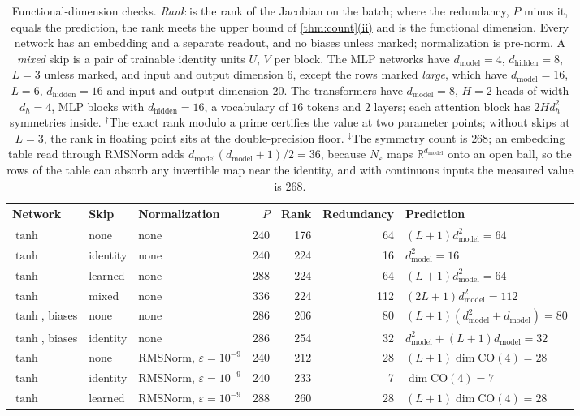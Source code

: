 \documentclass[10pt]{article}
\theoremstyle{definition}
\theoremstyle{remark}
\newcommand{\R}{\mathbb{R}}
\newcommand{\dm}{d_{\mathrm{model}}}
\newcommand{\dhid}{d_{\mathrm{hidden}}}
\newcommand{\CO}{\mathrm{CO}}
\DeclareRobustCommand{\cpref}[2]{\hyperref[#1:#2]{\cref*{#1}(#2)}}
\begin{document}
\begin{table}[ht]
\centering\footnotesize\setlength{\tabcolsep}{2pt}
\caption{Functional-dimension checks. \emph{Rank} is the rank of the Jacobian on the batch; where the redundancy, $P$ minus it, equals the prediction, the rank meets the upper bound of \cpref{thm:count}{ii} and is the functional dimension. Every network has an embedding and a separate readout, and no biases unless marked; normalization is pre-norm. A \emph{mixed} skip is a pair of trainable identity units $U$, $V$ per block. The MLP networks have $\dm = 4$, $\dhid = 8$, $L = 3$ unless marked, and input and output dimension $6$, except the rows marked \emph{large}, which have $\dm = 16$, $L = 6$, $\dhid = 16$ and input and output dimension $20$. The transformers have $\dm = 8$, $H = 2$ heads of width $d_h = 4$, MLP blocks with $\dhid = 16$, a vocabulary of $16$ tokens and $2$ layers; each attention block has $2Hd_h^2$ symmetries inside. $^\dagger$The exact rank modulo a prime certifies the value at two parameter points; without skips at $L = 3$, the rank in floating point sits at the double-precision floor. $^\ddagger$The symmetry count is $268$; an embedding table read through RMSNorm adds $\dm(\dm+1)/2 = 36$, because $N_\varepsilon$ maps $\R^{\dm}$ onto an open ball, so the rows of the table can absorb any invertible map near the identity, and with continuous inputs the measured value is $268$.}
\label{tab:checks}
\begin{tabular}{@{}lllrrrl@{}}
\toprule
Network & Skip & Normalization & $P$ & Rank & Redundancy & Prediction \\
\midrule
$\tanh$ & none & none & 240 & 176 & 64 & $(L{+}1)\dm^2 = 64$ \\
$\tanh$ & identity & none & 240 & 224 & 16 & $\dm^2 = 16$ \\
$\tanh$ & learned & none & 288 & 224 & 64 & $(L{+}1)\dm^2 = 64$ \\
$\tanh$ & mixed & none & 336 & 224 & 112 & $(2L{+}1)\dm^2 = 112$ \\
$\tanh$, biases & none & none & 286 & 206 & 80 & $(L{+}1)(\dm^2{+}\dm) = 80$ \\
$\tanh$, biases & identity & none & 286 & 254 & 32 & $\dm^2 + (L{+}1)\dm = 32$ \\
\addlinespace
$\tanh$ & none & RMSNorm, $\varepsilon = 10^{-9}$ & 240 & 212 & 28 & $(L{+}1)\dim\CO(4) = 28$ \\
$\tanh$ & identity & RMSNorm, $\varepsilon = 10^{-9}$ & 240 & 233 & 7 & $\dim\CO(4) = 7$ \\
$\tanh$ & learned & RMSNorm, $\varepsilon = 10^{-9}$ & 288 & 260 & 28 & $(L{+}1)\dim\CO(4) = 28$ \\

\end{tabular}
\end{table}
\end{document}
